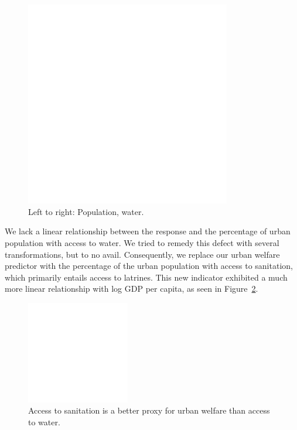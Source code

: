 \documentclass[11pt]{article}
\begin{document}
\begin{figure}[!ht]
  \centering
  \includegraphics[width=0.8\textwidth]{images/urban_model_scatter_pop_water}
  \caption{\label{urban_model_scatter_pop_water}Left to right: Population, water.}
\end{figure}

We lack a linear relationship between the response and the percentage of urban population with access to water. We tried to remedy this defect with several transformations, but to no avail. Consequently, we replace our urban welfare predictor with the percentage of the urban population with access to sanitation, which primarily entails access to latrines. This new indicator exhibited a much more linear relationship with log GDP per capita, as seen in Figure~\ref{urban_model_scatter_san}.

\begin{figure}[!ht]
  \centering
  \includegraphics[width=0.4\textwidth]{images/urban_model_scatter_san}
  \caption{\label{urban_model_scatter_san}Access to sanitation is a better proxy for urban welfare than access to water.}
\end{figure}
\end{document}
